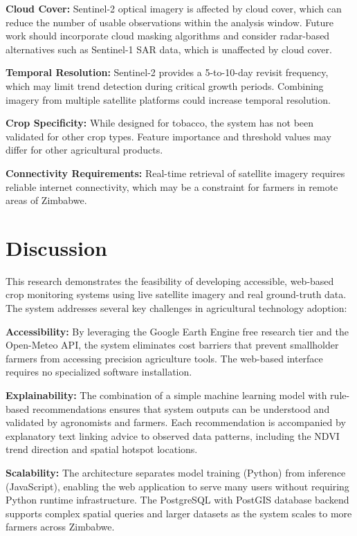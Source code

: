 \documentclass[journal]{IEEEtran}
\begin{document}
\textbf{Cloud Cover:} Sentinel-2 optical imagery is affected by cloud cover, which can reduce the number of usable observations within the analysis window. Future work should incorporate cloud masking algorithms and consider radar-based alternatives such as Sentinel-1 SAR data, which is unaffected by cloud cover.

\textbf{Temporal Resolution:} Sentinel-2 provides a 5-to-10-day revisit frequency, which may limit trend detection during critical growth periods. Combining imagery from multiple satellite platforms could increase temporal resolution.

\textbf{Crop Specificity:} While designed for tobacco, the system has not been validated for other crop types. Feature importance and threshold values may differ for other agricultural products.

\textbf{Connectivity Requirements:} Real-time retrieval of satellite imagery requires reliable internet connectivity, which may be a constraint for farmers in remote areas of Zimbabwe.

\section{Discussion}

This research demonstrates the feasibility of developing accessible, web-based crop monitoring systems using live satellite imagery and real ground-truth data. The system addresses several key challenges in agricultural technology adoption:

\textbf{Accessibility:} By leveraging the Google Earth Engine free research tier and the Open-Meteo API, the system eliminates cost barriers that prevent smallholder farmers from accessing precision agriculture tools. The web-based interface requires no specialized software installation.

\textbf{Explainability:} The combination of a simple machine learning model with rule-based recommendations ensures that system outputs can be understood and validated by agronomists and farmers. Each recommendation is accompanied by explanatory text linking advice to observed data patterns, including the NDVI trend direction and spatial hotspot locations.

\textbf{Scalability:} The architecture separates model training (Python) from inference (JavaScript), enabling the web application to serve many users without requiring Python runtime infrastructure. The PostgreSQL with PostGIS database backend supports complex spatial queries and larger datasets as the system scales to more farmers across Zimbabwe.
\end{document}
